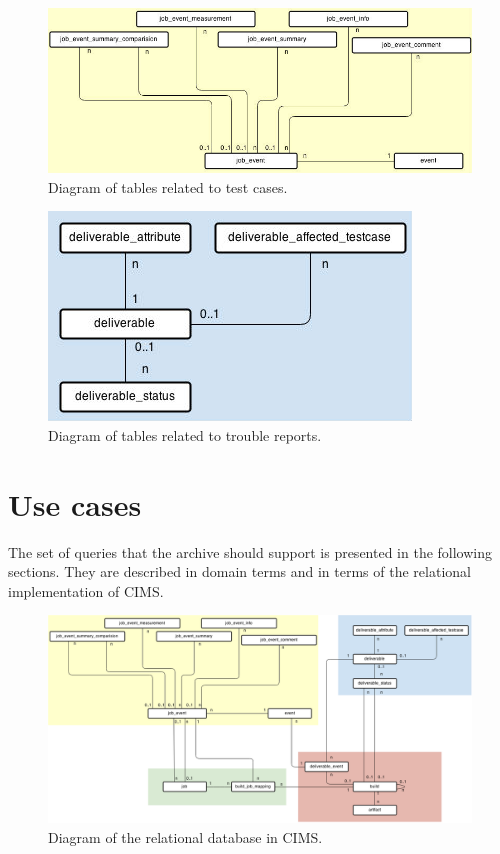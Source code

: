 \begin{figure}[h!]
\centering
\includegraphics[scale=0.5]{figure/job_event.jpg}
\caption{Diagram of tables related to test cases.}
\label{fig:job_event}
\end{figure}

\begin{figure}[h!]
\centering
\includegraphics[scale=0.5]{figure/deliverable.jpg}
\caption{Diagram of tables related to trouble reports.}
\label{fig:deliverable}
\end{figure}


\section{Use cases}
\label{sec:usecases}
The set of queries that the archive should support is presented in the following sections. They are described in domain terms and in terms of the relational implementation of CIMS.


\begin{figure}[h!]
\centering
\includegraphics[scale=0.5, angle=90]{figure/sql.png}
\caption{Diagram of the relational database in CIMS.}
\label{fig:sql}
\end{figure}

